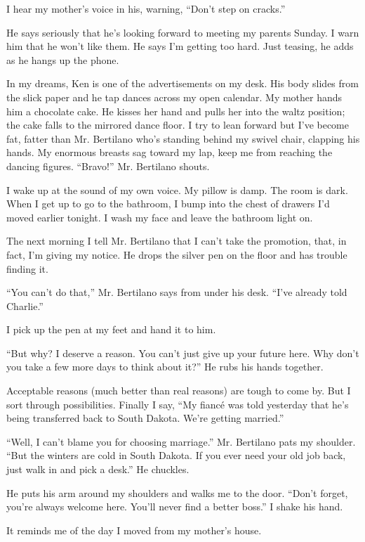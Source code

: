 \documentclass[
]{article}
\begin{document}
I hear my mother's voice in his, warning, ``Don't step on cracks.''

He says seriously that he's looking forward to meeting my parents
Sunday. I warn him that he won't like them. He says I'm getting too
hard. Just teasing, he adds as he hangs up the phone.

In my dreams, Ken is one of the advertisements on my desk. His body
slides from the slick paper and he tap dances across my open calendar.
My mother hands him a chocolate cake. He kisses her hand and pulls her
into the waltz position; the cake falls to the mirrored dance floor. I
try to lean forward but I've become fat, fatter than Mr. Bertilano who's
standing behind my swivel chair, clapping his hands. My enormous breasts
sag toward my lap, keep me from reaching the dancing figures. ``Bravo!''
Mr. Bertilano shouts.

I wake up at the sound of my own voice. My pillow is damp. The room is
dark. When I get up to go to the bathroom, I bump into the chest of
drawers I'd moved earlier tonight. I wash my face and leave the bathroom
light on.

The next morning I tell Mr. Bertilano that I can't take the promotion,
that, in fact, I'm giving my notice. He drops the silver pen on the
floor and has trouble finding it.

``You can't do that,'' Mr. Bertilano says from under his desk. ``I've
already told Charlie.''

I pick up the pen at my feet and hand it to him.

``But why? I deserve a reason. You can't just give up your future here.
Why don't you take a few more days to think about it?'' He rubs his
hands together.

Acceptable reasons (much better than real reasons) are tough to come by.
But I sort through possibilities. Finally I say, ``My fiancé was told
yesterday that he's being transferred back to South Dakota. We're
getting married.''

``Well, I can't blame you for choosing marriage.'' Mr. Bertilano pats my
shoulder. ``But the winters are cold in South Dakota. If you ever need
your old job back, just walk in and pick a desk.'' He chuckles.

He puts his arm around my shoulders and walks me to the door. ``Don't
forget, you're always welcome here. You'll never find a better boss.'' I
shake his hand.

It reminds me of the day I moved from my mother's house.
\end{document}
